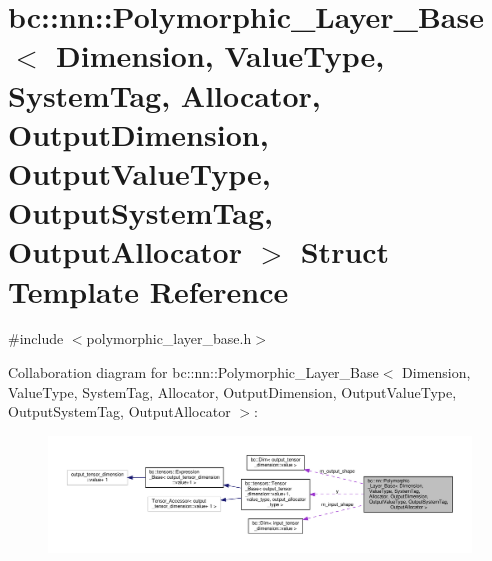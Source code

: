 \hypertarget{structbc_1_1nn_1_1Polymorphic__Layer__Base}{}\section{bc\+:\+:nn\+:\+:Polymorphic\+\_\+\+Layer\+\_\+\+Base$<$ Dimension, Value\+Type, System\+Tag, Allocator, Output\+Dimension, Output\+Value\+Type, Output\+System\+Tag, Output\+Allocator $>$ Struct Template Reference}
\label{structbc_1_1nn_1_1Polymorphic__Layer__Base}


{\ttfamily \#include $<$polymorphic\+\_\+layer\+\_\+base.\+h$>$}



Collaboration diagram for bc\+:\+:nn\+:\+:Polymorphic\+\_\+\+Layer\+\_\+\+Base$<$ Dimension, Value\+Type, System\+Tag, Allocator, Output\+Dimension, Output\+Value\+Type, Output\+System\+Tag, Output\+Allocator $>$\+:\nopagebreak
\begin{figure}[H]
\begin{center}
\leavevmode
\includegraphics[width=350pt]{structbc_1_1nn_1_1Polymorphic__Layer__Base__coll__graph}
\end{center}
\end{figure}
